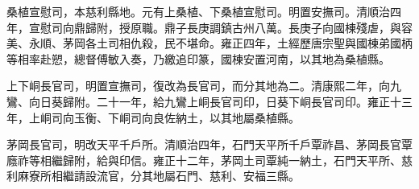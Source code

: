 \begin{pinyinscope}
桑植宣慰司，本慈利縣地。元有上桑植、下桑植宣慰司。明置安撫司。清順治四年，宣慰司向鼎歸附，授原職。鼎子長庚調鎮古州八萬。長庚子向國棟殘虐，與容美、永順、茅岡各土司相仇殺，民不堪命。雍正四年，土經歷唐宗聖與國棟弟國柄等相率赴愬，總督傅敏入奏，乃繳追印篆，國棟安置河南，以其地為桑植縣。

上下峒長官司，明置宣撫司，復改為長官司，而分其地為二。清康熙二年，向九鸞、向日葵歸附。二十一年，給九鸞上峒長官司印，日葵下峒長官司印。雍正十三年，上峒司向玉衡、下峒司向良佐納土，以其地屬桑植縣。

茅岡長官司，明改天平千戶所。清順治四年，石門天平所千戶覃祚昌、茅岡長官覃廕祚等相繼歸附，給與印信。雍正十二年，茅岡土司覃純一納土，石門天平所、慈利麻寮所相繼請設流官，分其地屬石門、慈利、安福三縣。


\end{pinyinscope}